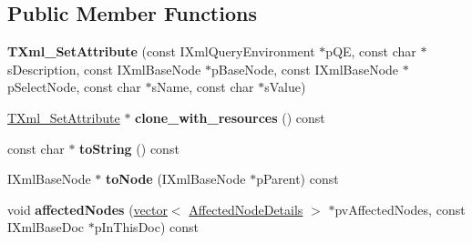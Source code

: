 \subsection*{\-Public \-Member \-Functions}
\begin{DoxyCompactItemize}
\item 
\hypertarget{classgeneral__server_1_1TXml__SetAttribute_a77dfc234a84f80dc491c2f62ec6d3e3c}{{\bfseries \-T\-Xml\-\_\-\-Set\-Attribute} (const \-I\-Xml\-Query\-Environment $\ast$p\-Q\-E, const char $\ast$s\-Description, const \-I\-Xml\-Base\-Node $\ast$p\-Base\-Node, const \-I\-Xml\-Base\-Node $\ast$p\-Select\-Node, const char $\ast$s\-Name, const char $\ast$s\-Value)}\label{classgeneral__server_1_1TXml__SetAttribute_a77dfc234a84f80dc491c2f62ec6d3e3c}

\item 
\hypertarget{classgeneral__server_1_1TXml__SetAttribute_a09676269467bb69c2ef8b852fe22e848}{\hyperlink{classgeneral__server_1_1TXml__SetAttribute}{\-T\-Xml\-\_\-\-Set\-Attribute} $\ast$ {\bfseries clone\-\_\-with\-\_\-resources} () const }\label{classgeneral__server_1_1TXml__SetAttribute_a09676269467bb69c2ef8b852fe22e848}

\item 
\hypertarget{classgeneral__server_1_1TXml__SetAttribute_a70bbd82d740b2f281210cc117b3709cd}{const char $\ast$ {\bfseries to\-String} () const }\label{classgeneral__server_1_1TXml__SetAttribute_a70bbd82d740b2f281210cc117b3709cd}

\item 
\hypertarget{classgeneral__server_1_1TXml__SetAttribute_ace2d99852a0645f45bf4e2608b512e93}{\-I\-Xml\-Base\-Node $\ast$ {\bfseries to\-Node} (\-I\-Xml\-Base\-Node $\ast$p\-Parent) const }\label{classgeneral__server_1_1TXml__SetAttribute_ace2d99852a0645f45bf4e2608b512e93}

\item 
\hypertarget{classgeneral__server_1_1TXml__SetAttribute_a55a433062f4fe316a4eb48eb8632948f}{void {\bfseries affected\-Nodes} (\hyperlink{classvector}{vector}$<$ \hyperlink{structgeneral__server_1_1TXml_1_1AffectedNodeDetails}{\-Affected\-Node\-Details} $>$ $\ast$pv\-Affected\-Nodes, const \-I\-Xml\-Base\-Doc $\ast$p\-In\-This\-Doc) const }\label{classgeneral__server_1_1TXml__SetAttribute_a55a433062f4fe316a4eb48eb8632948f}

\end{DoxyCompactItemize}
